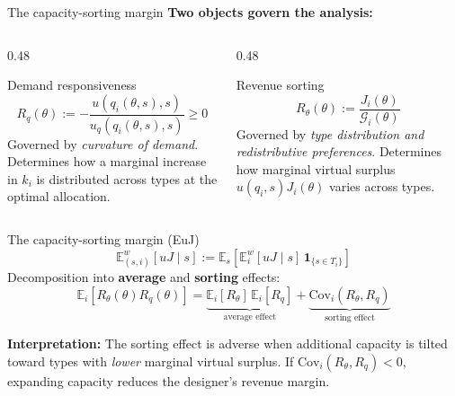 \documentclass[10pt, aspectratio=169]{beamer}
\newcommand{\E}{\mathbb{E}}
\newcommand{\G}{\mathcal{G}}
\newcommand{\Cov}{\mathrm{Cov}}
\begin{document}
\begin{frame}{The capacity-sorting margin}
\textbf{Two objects govern the analysis:}
\begin{columns}
\begin{column}{0.48\textwidth}
\begin{block}{Demand responsiveness}
\[ R_q(\theta) := -\frac{u(q_i(\theta,s),s)}{u_q(q_i(\theta,s),s)} \geq 0 \]
Governed by \emph{curvature of demand}. Determines how a marginal increase in $k_i$ is distributed across types at the optimal allocation.
\end{block}
\end{column}
\begin{column}{0.48\textwidth}
\begin{block}{Revenue sorting}
\[ R_\theta(\theta) := \frac{J_i(\theta)}{\G_i(\theta)} \]
Governed by \emph{type distribution and redistributive preferences}. Determines how marginal virtual surplus $u(q_i,s)J_i(\theta)$ varies across types.
\end{block}
\end{column}
\end{columns}
\vspace{0.3cm}
\begin{alertblock}{The capacity-sorting margin (EuJ)}
\[ \E_{(s,i)}^w[uJ \mid s] := \E_s\!\left[\E_i^w[uJ \mid s]\, \mathbf{1}_{\{s \in T_i\}}\right] \]
Decomposition into \textbf{average} and \textbf{sorting} effects:
\[ \E_i\!\left[R_\theta(\theta) R_q(\theta)\right] = \underbrace{\E_i[R_\theta]\, \E_i[R_q]}_{\text{average effect}} + \underbrace{\Cov_i(R_\theta, R_q)}_{\text{sorting effect}} \tag{signEuJ} \]
\end{alertblock}
\vspace{0.1cm}
\textbf{Interpretation:} The sorting effect is adverse when additional capacity is tilted toward types with \emph{lower} marginal virtual surplus. If $\Cov_i(R_\theta, R_q) < 0$, expanding capacity reduces the designer's revenue margin.
\end{frame}
\end{document}
